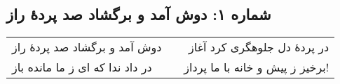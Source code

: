 \begin{center}
\section*{شماره ۱: دوش آمد و برگشاد صد پردۀ راز}
\label{sec:001}
\begin{longtable}{l p{0.5cm} r}
دوش آمد و برگشاد صد پردهٔ راز
&&
در پردهٔ دل جلوهگری کرد آغاز
\\
در داد ندا که ای ز ما مانده باز
&&
برخیز ز پیش و خانه با ما پرداز!
\\
\end{longtable}
\end{center}

